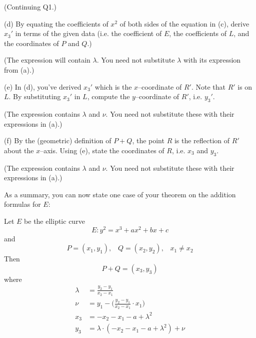 \documentclass[a4paper,12pt]{article}
\begin{document}
\SOLUTION



\newpage

(Continuing Q1.)

(d) By equating the coefficients of $x^2$ of both sides of
the equation in (c), derive $x_3'$ in terms of the 
given data (i.e. the coefficient of $E$, the coefficients of $L$,
and the coordinates of $P$ and $Q$.) 

(The expression will contain $\lambda$. You need not substitute
$\lambda$ with its expression from (a).)

\SOLUTION



\newpage

(e) In (d), you've derived $x_3'$ which is the $x$--coordinate of $R'$.
Note that $R'$ is on $L$. By substituting $x_3'$ in $L$, compute
the $y$--coordinate of $R'$, i.e. $y_3'$.

(The expression contains $\lambda$ and $\nu$. 
You need not substitute these with their expressions in (a).)

\SOLUTION



\newpage

(f) By the (geometric) definition of $P + Q$, 
the point $R$ is the reflection of $R'$ about the $x$--axis.
Using (e), state the coordinates of $R$, i.e. $x_3$ and $y_3$.

(The expression contains $\lambda$ and $\nu$. 
You need not substitute these with their expressions in (a).)

\SOLUTION




\newpage

As a summary, you can now state one case of 
your theorem on the addition formulas for $E$:

Let $E$ be the elliptic curve
\[
E: y^2 = x^3 + ax^2 + bx + c
\]
and 
\[
P = (x_1, y_1), \,\,\,\,\,
Q = (x_2, y_2), \,\,\,\,\,
x_1 \neq x_2
\]
Then 
\[
P + Q = (x_3, y_3)
\]
where
\begin{align*}
\lambda &= \frac{y_2 - y_1}{x_2 - x_1} \\
\nu &= y_1 - \biggr( \frac{y_2 - y_1}{x_2 - x_1} \cdot x_1 \biggl) \\
x_3 &= -x_2 - x_1 -a + {\lambda}^2 \\
y_3 &= \lambda \cdot (-x_2 - x_1 -a + {\lambda}^2) + \nu
\end{align*}
\end{document}
